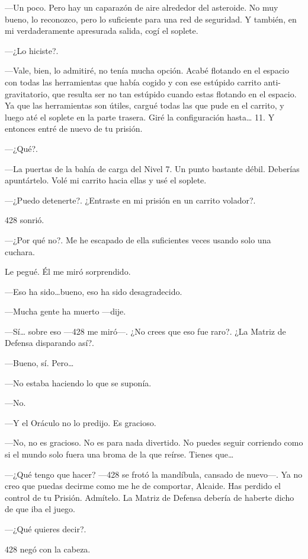 ---Un poco. Pero hay un caparazón de aire alrededor del asteroide. No
muy bueno, lo reconozco, pero lo suficiente para una red de seguridad. Y
también, en mi verdaderamente apresurada salida, cogí el soplete.

---¿Lo hiciste?.

---Vale, bien, lo admitiré, no tenía mucha opción. Acabé flotando en el
espacio con todas las herramientas que había cogido y con ese estúpido
carrito anti-gravitatorio, que resulta ser no tan estúpido cuando estas
flotando en el espacio. Ya que las herramientas son útiles, cargué todas
las que pude en el carrito, y luego até el soplete en la parte trasera.
Giré la configuración hasta\ldots{} 11. Y entonces entré de nuevo de tu
prisión.

---¿Qué?.

---La puertas de la bahía de carga del Nivel 7. Un punto bastante débil.
Deberías apuntártelo. Volé mi carrito hacia ellas y usé el soplete.

---¿Puedo detenerte?. ¿Entraste en mi prisión en un carrito volador?.

428 sonrió.

---¿Por qué no?. Me he escapado de ella suficientes veces usando solo
una cuchara.

Le pegué. Él me miró sorprendido.

---Eso ha sido\ldots{}bueno, eso ha sido desagradecido.

---Mucha gente ha muerto ---dije.

---Sí\ldots{} sobre eso ---428 me miró---. ¿No crees que eso fue raro?.
¿La Matriz de Defensa disparando así?.

---Bueno, sí. Pero\ldots{}

---No estaba haciendo lo que se suponía.

---No.

---Y el Oráculo no lo predijo. Es gracioso.

---No, no es gracioso. No es para nada divertido. No puedes seguir
corriendo como si el mundo solo fuera una broma de la que reírse. Tienes
que\ldots{}

---¿Qué tengo que hacer? ---428 se frotó la mandíbula, cansado de
nuevo---. Ya no creo que puedas decirme como me he de comportar,
Alcaide. Has perdido el control de tu Prisión. Admítelo. La Matriz de
Defensa debería de haberte dicho de que iba el juego.

---¿Qué quieres decir?.

428 negó con la cabeza.

